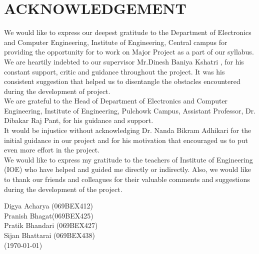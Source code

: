 \section*{ACKNOWLEDGEMENT}
We would like to express our deepest gratitude to the Department of Electronics and Computer Engineering, Institute of Engineering, Central campus for providing the opportunity for to work on Major Project as a part of our syllabus.\\
We are heartily indebted to our supervisor Mr.Dinesh Baniya Kshatri , for his constant support, critic and guidance throughout the project. It was his consistent suggestion that helped us to disentangle the obstacles encountered during the development of project.\\
We are grateful to the Head of Department of Electronics and Computer Engineering, Institute of Engineering, Pulchowk Campus, Assistant Professor, Dr. Dibakar Raj Pant, for his guidance and support.  \\
It would be injustice without acknowledging Dr. Nanda Bikram Adhikari  for the initial guidance in our project and for his motivation that encouraged us to put even more effort in the project. \\
 We would like to express my gratitude to the teachers of Institute of Engineering (IOE) who have helped and guided me directly or indirectly. Also, we would like to thank our friends and colleagues for their valuable comments and suggestions during the development of the project.\\ [1cm]
\begin{flushleft}
Digya Acharya (069BEX412) \\
Pranish Bhagat(069BEX425) \\
Pratik Bhandari (069BEX427) \\
Sijan Bhattarai (069BEX438)\\[5 mm]
(\today)\\ 
\end{flushleft}


